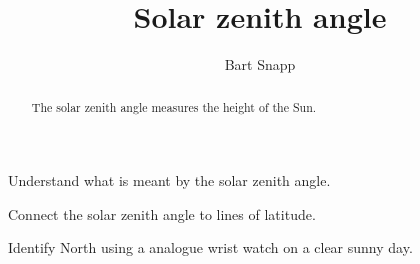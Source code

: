 \documentclass[noauthor,nooutcomes,handout,hints]{ximera}
\title{Solar zenith angle}
\author{Bart Snapp}
\begin{document}
\begin{abstract}
  The solar zenith angle measures the height of the Sun.
\end{abstract}
\maketitle

\begin{listOutcomes}
\item Understand what is meant by the solar zenith angle.
\item Connect the solar zenith angle to lines of latitude.
\item Identify North using a analogue wrist watch on a clear sunny day.
\end{listOutcomes}


\mynewpage
\end{document}
